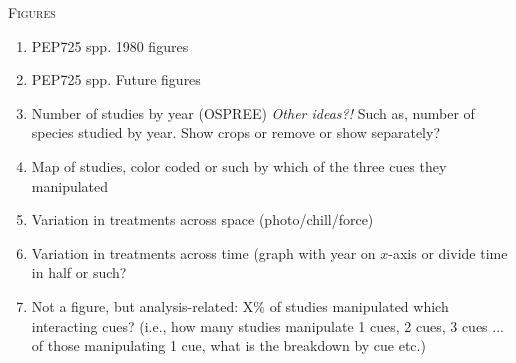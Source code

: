 \documentclass[11pt,letterpaper]{article}
\renewcommand{\section}[1]{%
\bigskip
\begin{center}
\begin{Large}
\normalfont\scshape #1
\medskip
\end{Large}
\end{center}}
\begin{document}
\section{Figures}
\begin{enumerate}
\item PEP725 spp. 1980 figures
\item PEP725 spp. Future figures
\item Number of studies by year (OSPREE) \emph{Other ideas?!} Such as, number of species studied by year. Show crops or remove or show separately?
\item Map of studies, color coded or such by which of the three cues they manipulated
\item Variation in treatments across space (photo/chill/force)
\item Variation in treatments across time (graph with year on $x$-axis or divide time in half or such? 
\item Not a figure, but analysis-related: X\% of studies manipulated which interacting cues? (i.e., how many studies manipulate 1 cues, 2 cues, 3 cues ... of those manipulating 1 cue, what is the breakdown by cue etc.)
\end{enumerate}












\end{document}
